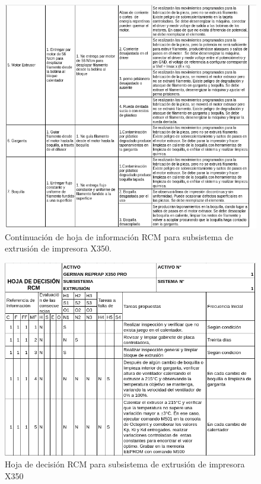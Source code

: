 \begin{figure}[H]
\centering
\includegraphics[scale=0.8]{images/amef3.png}
\caption{Continuación de hoja de información RCM para subsistema de extrusión de impresora X350.}
\end{figure}
\begin{figure}[H]
\centering
\includegraphics[scale=0.7]{images/decision1.png}
\caption{Hoja de decisión RCM para subsistema de extrusión de impresora X350}
\end{figure}

